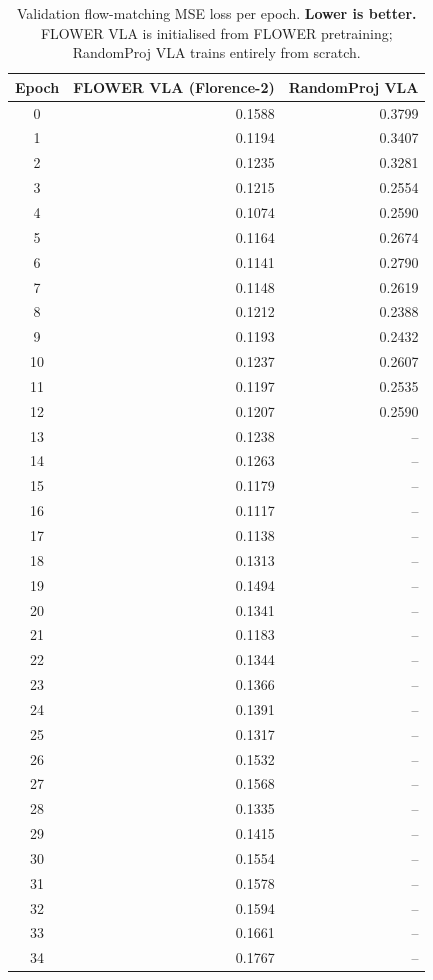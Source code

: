 \documentclass[11pt,a4paper]{article}
\begin{document}
\begin{table}[h]
\centering
{}
\begin{tabular}{crr}
\toprule
\textbf{Epoch} & \textbf{FLOWER VLA (Florence-2)} & \textbf{RandomProj VLA} \\
\midrule
0 & 0.1588 & 0.3799 \\
1 & 0.1194 & 0.3407 \\
2 & 0.1235 & 0.3281 \\
3 & 0.1215 & 0.2554 \\
4 & 0.1074 & 0.2590 \\
5 & 0.1164 & 0.2674 \\
6 & 0.1141 & 0.2790 \\
7 & 0.1148 & 0.2619 \\
8 & 0.1212 & 0.2388 \\
9 & 0.1193 & 0.2432 \\
10 & 0.1237 & 0.2607 \\
11 & 0.1197 & 0.2535 \\
12 & 0.1207 & 0.2590 \\
13 & 0.1238 & -- \\
14 & 0.1263 & -- \\
15 & 0.1179 & -- \\
16 & 0.1117 & -- \\
17 & 0.1138 & -- \\
18 & 0.1313 & -- \\
19 & 0.1494 & -- \\
20 & 0.1341 & -- \\
21 & 0.1183 & -- \\
22 & 0.1344 & -- \\
23 & 0.1366 & -- \\
24 & 0.1391 & -- \\
25 & 0.1317 & -- \\
26 & 0.1532 & -- \\
27 & 0.1568 & -- \\
28 & 0.1335 & -- \\
29 & 0.1415 & -- \\
30 & 0.1554 & -- \\
31 & 0.1578 & -- \\
32 & 0.1594 & -- \\
33 & 0.1661 & -- \\
34 & 0.1767 & -- \\
\bottomrule
\end{tabular}
\caption{Validation flow-matching MSE loss per epoch.
  \textbf{Lower is better.}
  FLOWER VLA is initialised from FLOWER pretraining;
  RandomProj VLA trains entirely from scratch.}
\label{tab:val_loss}
\end{table}
\end{document}
